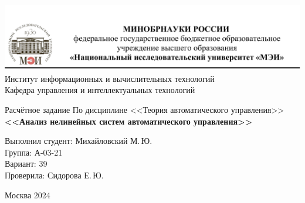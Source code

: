 \begin{titlepage}
	\newpage
	\begin{center}
		\includegraphics[width=\textwidth]{png/tit.png}
		Институт информационных и вычислительных технологий \\
			Кафедра управления и интеллектуальных технологий
		\vspace{1.25cm}
	\end{center}
	
	\vspace{1.2em}
	
	\begin{center}
		\begin{spacing}{1}
			{\Large Расчётное задание \linebreak
			По дисциплине <<Теория автоматического управления>> \\}
			\large{\bf<<Анализ нелинейных систем автоматического управления>>}
		\end{spacing}
	\end{center}
	
	\vspace{5em}
	

	\vspace{6em}
	
		\noindent Выполнил студент: Михайловский М.\,Ю. \\
		Группа: А-03-21 \\
		Вариант: 39\\
		Проверила: Сидорова Е.\,Ю.
	
	
	\vspace{\fill}
	
	\begin{center}
		Москва 2024
	\end{center}
	
\end{titlepage}